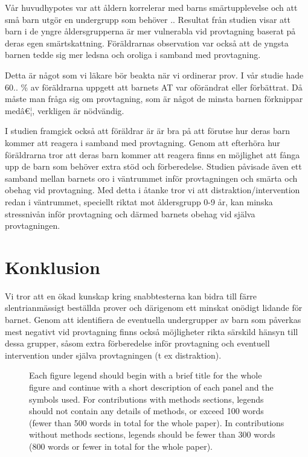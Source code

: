 \documentclass[12pt,twocolumn]{article}
\begin{document}
V\r{a}r huvudhypotes var att \r{a}ldern korrelerar med barns sm\"artupplevelse och att sm\r{a}
barn utg\"or en undergrupp som beh\"over ..  Resultat fr\r{a}n studien visar att barn i
de yngre \r{a}ldersgrupperna \"ar mer vulnerabla vid provtagning baserat p\r{a} deras egen
sm\"artskattning. F\"or\"aldrarnas observation var ocks\r{a} att de yngsta barnen tedde
sig mer ledsna och oroliga i samband med provtagning.

Detta \"ar n\r{a}got som vi l\"akare b\"or beakta n\"ar vi ordinerar prov. I v\r{a}r studie hade
60.. \% av f\"or\"aldrarna uppgett att barnets AT var of\"or\"andrat eller f\"orb\"attrat.
D\r{a} m\r{a}ste man fr\r{a}ga sig om provtagning, som \"ar n\r{a}got de minsta barnen
f\"orknippar medâ€¦, verkligen \"ar n\"odv\"andig.

I studien framgick ocks\r{a} att f\"or\"aldrar \"ar \"ar bra p\r{a} att f\"orutse hur deras barn
kommer att reagera i samband med provtagning. Genom att efterh\"ora hur
f\"or\"aldrarna tror att deras barn kommer att  reagera finns en m\"ojlighet att f\r{a}nga
upp de barn som beh\"over extra st\"od och f\"orberedelse. Studien p\r{a}visade \"aven ett
samband mellan barnets oro i v\"antrummet inf\"or provtagningen och sm\"arta och
obehag vid provtagning. Med detta i \r{a}tanke tror vi att distraktion/intervention
redan i v\"antrummet, speciellt riktat mot \r{a}ldersgrupp 0-9 \r{a}r, kan minska
stressniv\r{a}n inf\"or provtagning och d\"armed barnets obehag vid sj\"alva
provtagningen.

\section{Konklusion}

Vi tror att en \"okad kunskap kring snabbtesterna kan bidra till f\"arre
slentrianm\"assigt best\"allda prover och d\"arigenom ett minskat on\"odigt lidande f\"or
barnet. Genom att identifiera de eventuella undergrupper av barn som p\r{a}verkas
mest negativt vid provtagning finns ocks\r{a} m\"ojligheter rikta s\"arskild h\"ansyn till
dessa grupper, s\r{a}som extra f\"orberedelse inf\"or provtagning och eventuell
intervention under sj\"alva provtagningen (t ex distraktion).


\begin{figure}
\caption{Each figure legend should begin with a brief title for
the whole figure and continue with a short description of each
panel and the symbols used. For contributions with methods
sections, legends should not contain any details of methods, or
exceed 100 words (fewer than 500 words in total for the whole
paper). In contributions without methods sections, legends should
be fewer than 300 words (800 words or fewer in total for the whole
paper).}
\end{figure}
\end{document}
